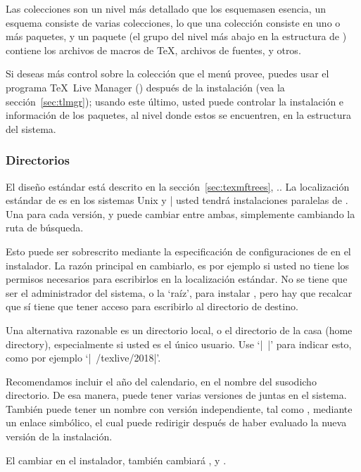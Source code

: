 \documentclass{article}
\begin{document}
Las colecciones son un nivel más detallado que los esquemas\Dash en
esencia, un esquema consiste de varias colecciones, lo que una colección
consiste en uno o más paquetes, y un paquete (el grupo del nivel más
abajo en la estructura de \TL) contiene los archivos de macros de
\TeX{}, archivos de fuentes, y otros.

Si deseas más control sobre la colección que el menú provee, puedes
usar el programa \TeX\ Live Manager () después de la
instalación (vea la sección~\ref{sec:tlmgr}); usando este último,
usted puede controlar la instalación e información de los paquetes, al
nivel donde estos se encuentren, en la estructura del sistema.

\subsubsection{Directorios}
\label{sec:directories}

El diseño estándar está descrito en la sección~\ref{sec:texmftrees},
\p.\pageref{sec:texmftrees}. La localización estándar de
 es  en los sistemas
Unix y |%
usted tendrá instalaciones paralelas de \TL. Una para cada versión, y puede
cambiar entre ambas, simplemente cambiando la ruta de búsqueda. 

Esto puede ser sobrescrito mediante la especificación de
configuraciones
de  en el instalador. La razón principal en cambiarlo,
es por ejemplo si usted no tiene los permisos necesarios para
escribirlos en la localización estándar. No se tiene que ser el
administrador del sistema, o la `raíz', para instalar \TL, pero hay que recalcar que sí
tiene que tener acceso para escribirlo al directorio de destino. 

Una alternativa razonable es un directorio local, o el
directorio de la casa (home directory), especialmente si
usted es el único usuario. Use `|~|' para indicar esto, como
por ejemplo `|~/texlive/2018|'.

Recomendamos incluir el año del calendario, en el nombre del susodicho
directorio. De esa manera, puede tener varias versiones de \TL{}
juntas en el sistema. También puede tener un nombre con versión
independiente, tal como , mediante un
enlace simbólico, el cual puede redirigir después de haber evaluado la
nueva versión de la instalación.

El cambiar  en el instalador, también cambiará
,  y
.
\end{document}

